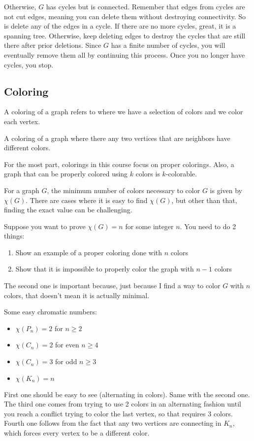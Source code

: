 \documentclass[11pt]{scrartcl}
\begin{document}
Otherwise, $G$ has cycles but is connected. Remember that edges from cycles are not cut edges, meaning you can delete them without destroying connectivity. So is delete any of the edges in a cycle. If there are no more cycles, great, it is a spanning tree. Otherwise, keep deleting edges to destroy the cycles that are still there after prior deletions. Since $G$ has a finite number of cycles, you will eventually remove them all by continuing this process. Once you no longer have cycles, you stop.

\subsection{Coloring}

A coloring of a graph refers to where we have a selection of colors and we color each vertex.

\begin{definition}
A coloring of a graph where there any two vertices that are neighbors have different colors.
\end{definition}

For the most part, colorings in this course focus on proper colorings. Also, a graph that can be properly colored using $k$ colors is $k$-colorable.

For a graph $G$, the minimum number of colors necessary to color $G$ is given by $\chi(G)$. There are cases where it is easy to find $\chi(G)$, but other than that, finding the exact value can be challenging.

\begin{advice}
Suppose you want to prove $\chi(G) = n$ for some integer $n$. You need to do 2 things:
\begin{enumerate}
    \item Show an example of a proper coloring done with $n$ colors
    \item Show that it is impossible to properly color the graph with $n-1$ colors
\end{enumerate}
The second one is important because, just because I find a way to color $G$ with $n$ colors, that doesn't mean it is actually minimal.
\end{advice}

\vspace{4mm}

\noindent
Some easy chromatic numbers:
\begin{itemize}
\item $\chi(P_n) = 2$ for $n \geq 2$
\item $\chi(C_n) = 2$ for even $n \geq 4$
\item $\chi(C_n) = 3$ for odd $n \geq 3$
\item $\chi(K_n) = n$
\end{itemize}
First one should be easy to see (alternating in colors). Same with the second one. The third one comes from trying to use 2 colors in an alternating fashion until you reach a conflict trying to color the last vertex, so that requires 3 colors. Fourth one follows from the fact that any two vertices are connecting in $K_n$, which forces every vertex to be a different color.
\end{document}
